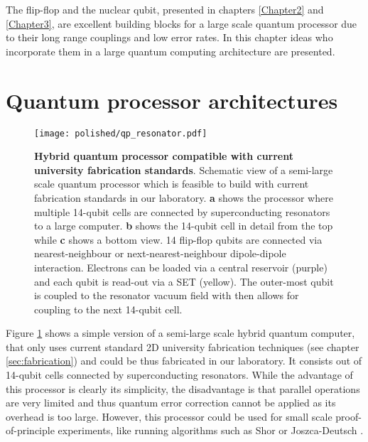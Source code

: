
\noindent \hrulefill
\clearpage

\normalsize

The flip-flop and the nuclear qubit, presented in chapters \ref{Chapter2} and \ref{Chapter3}, are excellent building blocks for a large scale quantum processor due to their long range couplings and low error rates. In this chapter ideas who incorporate them in a large quantum computing architecture are presented.   

\section{Quantum processor architectures}

\begin{figure}
	\centering
	\texttt{[image: polished/qp\_resonator.pdf]}
	\caption[Hybrid quantum processor compatible with current university fabrication standards]{\textbf{Hybrid quantum processor compatible with current university fabrication standards}. Schematic view of a semi-large scale quantum processor which is feasible to build with current fabrication standards in our laboratory. \textbf{a} shows the processor where multiple 14-qubit cells are connected by superconducting resonators to a large computer. \textbf{b} shows the 14-qubit cell in detail from the top while \textbf{c} shows a bottom view. 14 flip-flop qubits are connected via nearest-neighbour or next-nearest-neighbour dipole-dipole interaction. Electrons can be loaded via a central reservoir (purple) and each qubit is read-out via a SET (yellow). The outer-most qubit is coupled to the resonator vacuum field with then allows for coupling to the next 14-qubit cell. }
	\label{fig:qp_14cell}
\end{figure}

Figure \ref{fig:qp_14cell} shows a simple version of a semi-large scale hybrid quantum computer, that only uses current standard 2D university fabrication techniques (see chapter \ref{sec:fabrication}) and could be thus fabricated in our laboratory. It consists out of 14-qubit cells connected by superconducting resonators. While the advantage of this processor is clearly its simplicity, the disadvantage is that parallel operations are very limited and thus quantum error correction cannot be applied as its overhead is too large. However, this processor could be used for small scale proof-of-principle experiments, like running algorithms such as Shor or Joszca-Deutsch \cite{Shor, Joszca}. 

